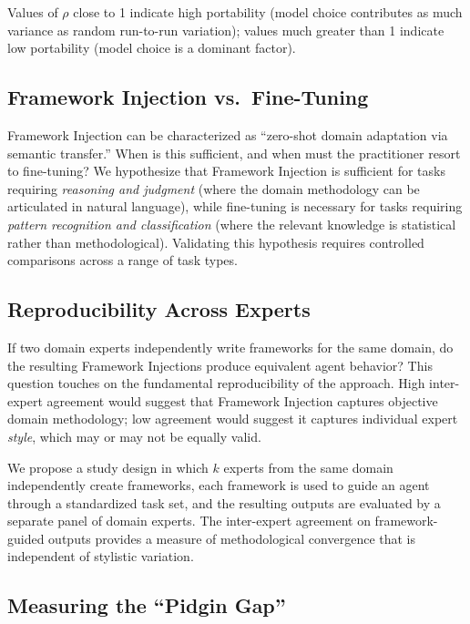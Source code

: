 \documentclass[12pt,a4paper]{article}
\begin{document}
Values of $\rho$ close to 1 indicate high portability (model choice contributes as much variance as random run-to-run variation); values much greater than 1 indicate low portability (model choice is a dominant factor).

\subsection{Framework Injection vs.\ Fine-Tuning}
\label{sec:future:finetuning}

Framework Injection can be characterized as ``zero-shot domain adaptation via semantic transfer.'' When is this sufficient, and when must the practitioner resort to fine-tuning? We hypothesize that Framework Injection is sufficient for tasks requiring \emph{reasoning and judgment} (where the domain methodology can be articulated in natural language), while fine-tuning is necessary for tasks requiring \emph{pattern recognition and classification} (where the relevant knowledge is statistical rather than methodological). Validating this hypothesis requires controlled comparisons across a range of task types.

\subsection{Reproducibility Across Experts}
\label{sec:future:reproducibility}

If two domain experts independently write frameworks for the same domain, do the resulting Framework Injections produce equivalent agent behavior? This question touches on the fundamental reproducibility of the approach. High inter-expert agreement would suggest that Framework Injection captures objective domain methodology; low agreement would suggest it captures individual expert \emph{style}, which may or may not be equally valid.

We propose a study design in which $k$ experts from the same domain independently create frameworks, each framework is used to guide an agent through a standardized task set, and the resulting outputs are evaluated by a separate panel of domain experts. The inter-expert agreement on framework-guided outputs provides a measure of methodological convergence that is independent of stylistic variation.

\subsection{Measuring the ``Pidgin Gap''}
\label{sec:future:pidgin}
\end{document}
